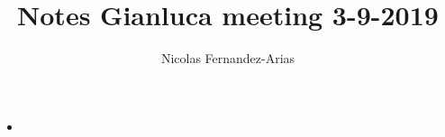 \documentclass[11pt,english]{article}
\theoremstyle{remark}
\begin{document}
	
\title{Notes Gianluca meeting 3-9-2019}
\author{Nicolas Fernandez-Arias}
\maketitle

\begin{itemize}
	\item 
\end{itemize}
\end{document}
